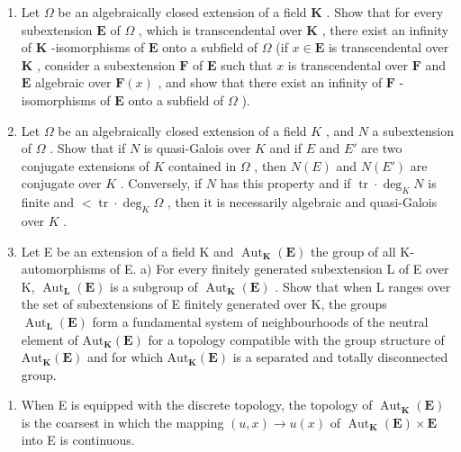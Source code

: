 \begin{enumerate}
\def\labelenumi{\arabic{enumi})}
\setcounter{enumi}{4}
\item
  Let \(\Omega\) be an algebraically closed extension of a field \(\mathbf{K}\) . Show that for every subextension \(\mathbf{E}\) of \(\Omega\) , which is transcendental over \(\mathbf{K}\) , there exist an infinity of \(\mathbf{K}\) -isomorphisms of \(\mathbf{E}\) onto a subfield of \(\Omega\) (if \(x \in \mathbf{E}\) is transcendental over \(\mathbf{K}\) , consider a subextension \(\mathbf{F}\) of \(\mathbf{E}\) such that \(x\) is transcendental over \(\mathbf{F}\) and \(\mathbf{E}\) algebraic over \(\mathbf{F}(x)\) , and show that there exist an infinity of \(\mathbf{F}\) -isomorphisms of \(\mathbf{E}\) onto a subfield of \(\Omega\) ).
\item
  Let \(\Omega\) be an algebraically closed extension of a field \(K\) , and \(N\) a subextension of \(\Omega\) . Show that if \(N\) is quasi-Galois over \(K\) and if \(E\) and \(E'\) are two conjugate extensions of \(K\) contained in \(\Omega\) , then \(N(E)\) and \(N(E')\) are conjugate over \(K\) . Conversely, if \(N\) has this property and if \(\operatorname{tr} \cdot \deg_{K} N\) is finite and \(< \operatorname{tr} \cdot \deg_{K} \Omega\) , then it is necessarily algebraic and quasi-Galois over \(K\) .
\item
  Let E be an extension of a field K and \(\operatorname{Aut}_{\mathbf{K}}(\mathbf{E})\) the group of all K-automorphisms of E. a) For every finitely generated subextension L of E over K, \(\operatorname{Aut}_{\mathbf{L}}(\mathbf{E})\) is a subgroup of \(\operatorname{Aut}_{\mathbf{K}}(\mathbf{E})\) . Show that when L ranges over the set of subextensions of E finitely generated over K, the groups \(\operatorname{Aut}_{\mathbf{L}}(\mathbf{E})\) form a fundamental system of neighbourhoods of the neutral element of \(\mathrm{Aut}_{\mathbf{K}}(\mathbf{E})\) for a topology compatible with the group structure of \(\mathrm{Aut}_{\mathbf{K}}(\mathbf{E})\) and for which \(\mathrm{Aut}_{\mathbf{K}}(\mathbf{E})\) is a separated and totally disconnected group.
\end{enumerate}

\begin{enumerate}
\def\labelenumi{\alph{enumi})}
\setcounter{enumi}{1}
\tightlist
\item
  When E is equipped with the discrete topology, the topology of \(\operatorname{Aut}_{\mathbf{K}}(\mathbf{E})\) is the coarsest in which the mapping \((u,x)\to u(x)\) of \(\operatorname{Aut}_{\mathbf{K}}(\mathbf{E})\times\mathbf{E}\) into E is continuous.
\end{enumerate}

